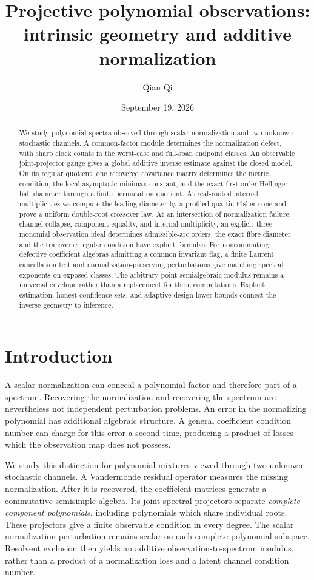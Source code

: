 \documentclass[11pt,reqno]{amsart}
\title[Projective polynomial observations]{Projective polynomial observations:\\ intrinsic geometry and additive normalization}
\author{Qian Qi}
\date{September 19, 2026}
\numberwithin{equation}{section}
\theoremstyle{definition}\newtheorem{definition}[theorem]{Definition}
\theoremstyle{remark}\newtheorem{remark}[theorem]{Remark}
\begin{document}
\begin{abstract}
We study polynomial spectra observed through scalar normalization and two
unknown stochastic channels. A common-factor module determines the normalization
defect, with sharp clock counts in the worst-case and full-span endpoint
classes. An observable joint-projector gauge gives a global additive inverse
estimate against the closed model. On its regular quotient, one recovered
covariance matrix determines the metric condition, the local asymptotic
minimax constant, and the exact first-order Hellinger-ball diameter through a
finite permutation quotient. At real-rooted internal multiplicities we compute
the leading diameter by a profiled quartic Fisher cone and prove a uniform
double-root crossover law. At an intersection of normalization failure,
channel collapse, component equality, and internal multiplicity, an explicit
three-monomial observation ideal determines admissible-arc orders; the exact
fibre diameter and the transverse regular condition have explicit formulas.
For noncommuting, defective coefficient algebras admitting a common invariant
flag, a finite Laurent cancellation test and normalization-preserving
perturbations give matching spectral exponents on exposed classes. The
arbitrary-point semialgebraic modulus remains a universal envelope rather than
a replacement for these computations. Explicit estimation, honest confidence
sets, and adaptive-design lower bounds connect the inverse geometry to
inference.
\end{abstract}
\maketitle

\section{Introduction}
A scalar normalization can conceal a polynomial factor and therefore
part of a spectrum. Recovering the normalization and recovering the
spectrum are nevertheless not independent perturbation problems. An
error in the normalizing polynomial has additional algebraic structure.
A general coefficient condition number can charge for this error a
second time, producing a product of losses which the observation map
does not possess.

We study this distinction for polynomial mixtures viewed through two
unknown stochastic channels. A Vandermonde residual operator measures
the missing normalization. After it is recovered, the coefficient
matrices generate a commutative semisimple algebra. Its joint spectral
projectors separate \emph{complete component polynomials}, including
polynomials which share individual roots. These projectors give a
finite observable condition in every degree. The scalar normalization
perturbation remains scalar on each complete-polynomial subspace.
Resolvent exclusion then yields an additive observation-to-spectrum
modulus, rather than a product of a normalization loss and a latent
channel condition number.
\end{document}
